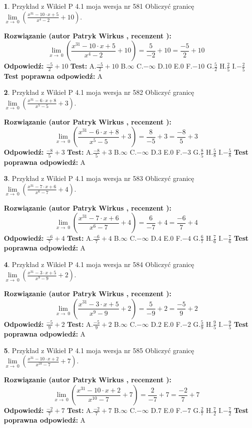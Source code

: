 \documentclass[12pt, a4paper]{article}
\theoremstyle{definition} %
\newtheorem{zad}{}
\newcommand{\zadStart}[1]{\begin{zad}#1\newline}
\newcommand{\zadStop}{\end{zad}}
\newcommand{\rozwStart}[2]{\noindent \textbf{Rozwiązanie (autor #1 , recenzent #2): }\newline}
\newcommand{\rozwStop}{\newline}
\newcommand{\odpStart}{\noindent \textbf{Odpowiedź:}\newline}
\newcommand{\odpStop}{\newline}
\newcommand{\testStart}{\noindent \textbf{Test:}\newline}
\newcommand{\testStop}{\newline}
\newcommand{\kluczStart}{\noindent \textbf{Test poprawna odpowiedź:}\newline}
\newcommand{\kluczStop}{\newline}
\begin{document}
\zadStart{Przykład z Wikieł P 4.1 moja wersja nr 581}
Obliczyć granicę $\lim\limits_{x\to\ 0}(\frac{x^{31}-10 \cdot x +5}{x^{4}-2}+10)$.
\zadStop
\rozwStart{Patryk Wirkus}{}
$$\lim\limits_{x\to\ 0}(\frac{x^{31}-10 \cdot x +5}{x^{4}-2}+10)=\frac{5}{-2}+10=\frac{-5}{2}+10$$
\rozwStop
\odpStart
$\frac{-5}{2}+10$
\odpStop
\testStart
A.$\frac{-5}{2}+10$
B.$\infty$
C.$-\infty$
D.$10$
E.$0$
F.$-10$
G.$\frac{5}{2}$
H.$\frac{2}{5}$
I.$-\frac{2}{5}$
\testStop
\kluczStart
A
\kluczStop



\zadStart{Przykład z Wikieł P 4.1 moja wersja nr 582}
Obliczyć granicę $\lim\limits_{x\to\ 0}(\frac{x^{31}-6 \cdot x +8}{x^{5}-5}+3)$.
\zadStop
\rozwStart{Patryk Wirkus}{}
$$\lim\limits_{x\to\ 0}(\frac{x^{31}-6 \cdot x +8}{x^{5}-5}+3)=\frac{8}{-5}+3=\frac{-8}{5}+3$$
\rozwStop
\odpStart
$\frac{-8}{5}+3$
\odpStop
\testStart
A.$\frac{-8}{5}+3$
B.$\infty$
C.$-\infty$
D.$3$
E.$0$
F.$-3$
G.$\frac{8}{5}$
H.$\frac{5}{8}$
I.$-\frac{5}{8}$
\testStop
\kluczStart
A
\kluczStop



\zadStart{Przykład z Wikieł P 4.1 moja wersja nr 583}
Obliczyć granicę $\lim\limits_{x\to\ 0}(\frac{x^{31}-7 \cdot x +6}{x^{6}-7}+4)$.
\zadStop
\rozwStart{Patryk Wirkus}{}
$$\lim\limits_{x\to\ 0}(\frac{x^{31}-7 \cdot x +6}{x^{6}-7}+4)=\frac{6}{-7}+4=\frac{-6}{7}+4$$
\rozwStop
\odpStart
$\frac{-6}{7}+4$
\odpStop
\testStart
A.$\frac{-6}{7}+4$
B.$\infty$
C.$-\infty$
D.$4$
E.$0$
F.$-4$
G.$\frac{6}{7}$
H.$\frac{7}{6}$
I.$-\frac{7}{6}$
\testStop
\kluczStart
A
\kluczStop



\zadStart{Przykład z Wikieł P 4.1 moja wersja nr 584}
Obliczyć granicę $\lim\limits_{x\to\ 0}(\frac{x^{31}-3 \cdot x +5}{x^{9}-9}+2)$.
\zadStop
\rozwStart{Patryk Wirkus}{}
$$\lim\limits_{x\to\ 0}(\frac{x^{31}-3 \cdot x +5}{x^{9}-9}+2)=\frac{5}{-9}+2=\frac{-5}{9}+2$$
\rozwStop
\odpStart
$\frac{-5}{9}+2$
\odpStop
\testStart
A.$\frac{-5}{9}+2$
B.$\infty$
C.$-\infty$
D.$2$
E.$0$
F.$-2$
G.$\frac{5}{9}$
H.$\frac{9}{5}$
I.$-\frac{9}{5}$
\testStop
\kluczStart
A
\kluczStop



\zadStart{Przykład z Wikieł P 4.1 moja wersja nr 585}
Obliczyć granicę $\lim\limits_{x\to\ 0}(\frac{x^{31}-10 \cdot x +2}{x^{10}-7}+7)$.
\zadStop
\rozwStart{Patryk Wirkus}{}
$$\lim\limits_{x\to\ 0}(\frac{x^{31}-10 \cdot x +2}{x^{10}-7}+7)=\frac{2}{-7}+7=\frac{-2}{7}+7$$
\rozwStop
\odpStart
$\frac{-2}{7}+7$
\odpStop
\testStart
A.$\frac{-2}{7}+7$
B.$\infty$
C.$-\infty$
D.$7$
E.$0$
F.$-7$
G.$\frac{2}{7}$
H.$\frac{7}{2}$
I.$-\frac{7}{2}$
\testStop
\kluczStart
A
\kluczStop
\end{document}
